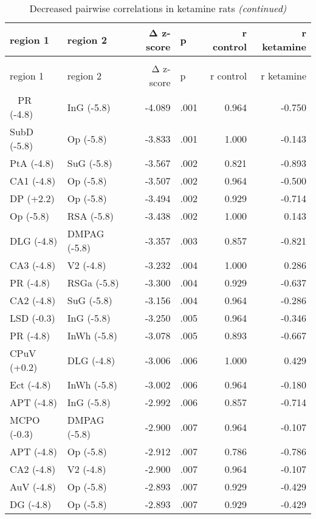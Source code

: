 \documentclass[man]{apa6}
\begin{document}
\begin{longtable}{llrlrr}
\caption{\label{tab:table-positive}Decreased pairwise correlations in ketamine rats}\\
\toprule
region 1 & region 2 & Δ z-score & p & r control & r ketamine\\
\midrule
\endfirsthead
\caption[]{\label{tab:table-positive}Decreased pairwise correlations in ketamine rats \textit{(continued)}}\\
\toprule
region 1 & region 2 & Δ z-score & p & r control & r ketamine\\
\midrule
\endhead
\
\endfoot
\bottomrule
\endlastfoot
PR (-4.8) & InG (-5.8) & -4.089 & .001 & 0.964 & -0.750\\
SubD (-5.8) & Op (-5.8) & -3.833 & .001 & 1.000 & -0.143\\
PtA (-4.8) & SuG (-5.8) & -3.567 & .002 & 0.821 & -0.893\\
CA1 (-4.8) & Op (-5.8) & -3.507 & .002 & 0.964 & -0.500\\
DP (+2.2) & Op (-5.8) & -3.494 & .002 & 0.929 & -0.714\\
\addlinespace
Op (-5.8) & RSA (-5.8) & -3.438 & .002 & 1.000 & 0.143\\
DLG (-4.8) & DMPAG (-5.8) & -3.357 & .003 & 0.857 & -0.821\\
CA3 (-4.8) & V2 (-4.8) & -3.232 & .004 & 1.000 & 0.286\\
PR (-4.8) & RSGa (-5.8) & -3.300 & .004 & 0.929 & -0.637\\
CA2 (-4.8) & SuG (-5.8) & -3.156 & .004 & 0.964 & -0.286\\
\addlinespace
LSD (-0.3) & InG (-5.8) & -3.250 & .005 & 0.964 & -0.346\\
PR (-4.8) & InWh (-5.8) & -3.078 & .005 & 0.893 & -0.667\\
CPuV (+0.2) & DLG (-4.8) & -3.006 & .006 & 1.000 & 0.429\\
Ect (-4.8) & InWh (-5.8) & -3.002 & .006 & 0.964 & -0.180\\
APT (-4.8) & InG (-5.8) & -2.992 & .006 & 0.857 & -0.714\\
\addlinespace
MCPO  (-0.3) & DMPAG (-5.8) & -2.900 & .007 & 0.964 & -0.107\\
APT (-4.8) & Op (-5.8) & -2.912 & .007 & 0.786 & -0.786\\
CA2 (-4.8) & V2 (-4.8) & -2.900 & .007 & 0.964 & -0.107\\
AuV (-4.8) & Op (-5.8) & -2.893 & .007 & 0.929 & -0.429\\
DG (-4.8) & Op (-5.8) & -2.893 & .007 & 0.929 & -0.429\\

\end{longtable}
\end{document}
